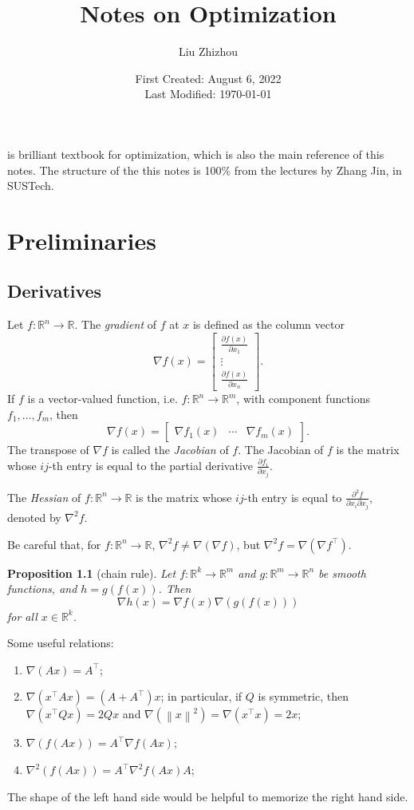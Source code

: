 \documentclass[12pt,a4paper]{report}
\title{Notes on Optimization}
\author{Liu Zhizhou}
\date{First Created: August 6, 2022\\
	Last Modified: \today}
\numberwithin{equation}{section}
\theoremstyle{mystyle}
\newtheorem{proposition}[definition]{Proposition}
\newcommand{\R}{\mathbb{R}}
\newcommand{\grad}{\nabla}
\newcommand{\T}{\top}
\newcommand{\norm}[1]{\left\lVert #1 \right\rVert}
\begin{document}
	{\sffamily \maketitle}
	
	\cite{Bertsekas/99} is brilliant textbook for optimization, which is also the main reference of this notes. The structure of the this notes is 100\% from the lectures by Zhang Jin, in SUSTech.
	
	\tableofcontents
	\chapter{Preliminaries}
	\section{Derivatives}
	Let $f:\R^n \to \R$. The \emph{gradient} of $f$ at $x$ is defined as the column vector
	$$
	\grad f(x)=
	\begin{bmatrix}
		\frac{\partial f(x)}{\partial x_1}\\
		\vdots\\
		\frac{\partial f(x)}{\partial x_n}
	\end{bmatrix}.
	$$
	If $f$ is a vector-valued function, i.e. $f:\R^n\to \R^m$, with component functions $f_1,\dots,f_m$, then
	$$
	\grad f(x)=
	\begin{bmatrix}
		\grad f_1(x) & \cdots & \grad f_m(x)
	\end{bmatrix}.
	$$
	The transpose of $\grad f$ is called the \emph{Jacobian} of $f$. The Jacobian of $f$ is the matrix whose $ij$-th entry is equal to the partial derivative $\frac{\partial f_i}{\partial x_j}$.
	
	The \emph{Hessian} of $f:\R^n\to \R$ is the matrix whose $ij$-th entry is equal to $\frac{\partial^2 f}{\partial x_i \partial x_j}$, denoted by $\grad^2 f$.
	
	Be careful that, for $f:\R^n \to \R$, $\grad^2 f\neq \grad(\grad f)$, but $\grad^2 f = \grad(\grad f^\T)$.
	\begin{proposition}[chain rule]
		Let $f:\R^k\to \R^m$ and $g:\R^m\to\R^n$ be smooth functions, and $h=g(f(x))$. Then
		$$
		\grad h(x) = \grad f(x)\grad(g(f(x)))
		$$
		for all $x\in \R^k$.
	\end{proposition}
	Some useful relations:
	\begin{enumerate}
		\item $\grad (Ax)=A^\T$;
		\item $\grad (x^\T A x)=(A+A^\T)x$; in particular, if $Q$ is symmetric, then $\grad(x^\T Q x)=2Qx$ and $\grad(\norm{x}^2)=\grad(x^\T x)=2x$;
		\item $\grad(f(Ax))=A^\T \grad f(Ax)$;
		\item $\grad^2(f(Ax))=A^\T \grad^2 f(Ax)A$;
	\end{enumerate}
	The shape of the left hand side would be helpful to memorize the right hand side.
	
\end{document}
